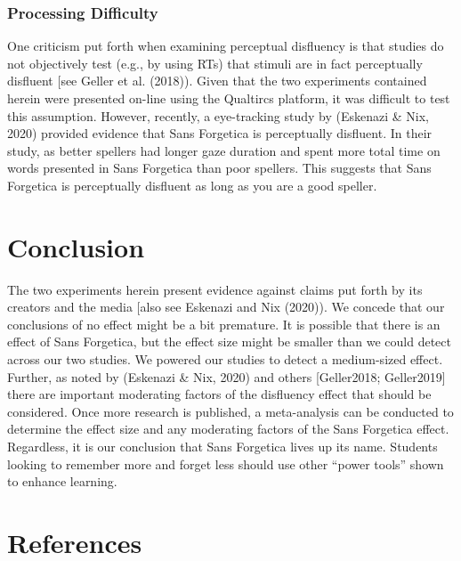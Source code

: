\documentclass[english,pdf]{apa6}
\begin{document}
\hypertarget{processing-difficulty}{%
\subsubsection{Processing Difficulty}\label{processing-difficulty}}

One criticism put forth when examining perceptual disfluency is that studies do not objectively test (e.g., by using RTs) that stimuli are in fact perceptually disfluent {[}see Geller et al. (2018)). Given that the two experiments contained herein were presented on-line using the Qualtircs platform, it was difficult to test this assumption. However, recently, a eye-tracking study by (Eskenazi \& Nix, 2020) provided evidence that Sans Forgetica is perceptually disfluent. In their study, as better spellers had longer gaze duration and spent more total time on words presented in Sans Forgetica than poor spellers. This suggests that Sans Forgetica is perceptually disfluent as long as you are a good speller.

\hypertarget{conclusion}{%
\section{Conclusion}\label{conclusion}}

The two experiments herein present evidence against claims put forth by its creators and the media {[}also see Eskenazi and Nix (2020)). We concede that our conclusions of no effect might be a bit premature. It is possible that there is an effect of Sans Forgetica, but the effect size might be smaller than we could detect across our two studies. We powered our studies to detect a medium-sized effect. Further, as noted by (Eskenazi \& Nix, 2020) and others {[}Geller2018; Geller2019{]} there are important moderating factors of the disfluency effect that should be considered. Once more research is published, a meta-analysis can be conducted to determine the effect size and any moderating factors of the Sans Forgetica effect. Regardless, it is our conclusion that Sans Forgetica lives up its name. Students looking to remember more and forget less should use other \enquote{power tools} shown to enhance learning.

\newpage

\hypertarget{references}{%
\section{References}\label{references}}
\end{document}
